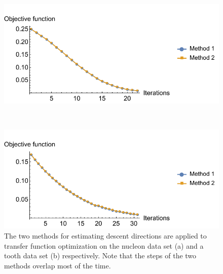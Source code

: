 \begin{figure}
	\centering
	\begin{minipage}{.49\textwidth}
		\includegraphics[width=1\linewidth]{figures/nucleon_naive_proportional_rms_fixed_newton}
		\subcaption{}
	\end{minipage}~
	\begin{minipage}{.49\textwidth}
		\includegraphics[width=1\linewidth]{figures/tooth_naive_proportional_rms_fixed_newton}
		\subcaption{}	
	\end{minipage}
	\caption[The two methods for estimating descent directions]
	{The two methods for estimating descent directions are applied to transfer function optimization on the nucleon data set (a) and a tooth data set (b) respectively. Note that the steps of the two methods overlap most of the time.
		}
	\label{fig:nucleon_naive_tooth_naive_rms}
\end{figure}

